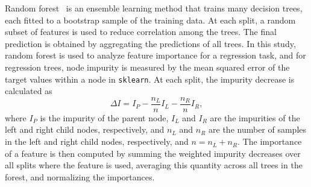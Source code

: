 Random forest~\cite{breiman2001random} is an ensemble learning method that trains many decision trees, each fitted to a bootstrap sample of the training data.
At each split, a random subset of features is used to reduce correlation among the trees.
The final prediction is obtained by aggregating the predictions of all trees.
In this study, random forest is used to analyze feature importance for a regression task, and for regression trees, node impurity is measured by the mean squared error of the target values within a node in \texttt{sklearn}.
At each split, the impurity decrease is calculated as
\begin{equation}
	\Delta I = I_P - \frac{n_L}{n}I_L - \frac{n_R}{n}I_R,
\end{equation}
where \(I_P\) is the impurity of the parent node, \(I_L\) and \(I_R\) are the impurities of the left and right child nodes, respectively, and \(n_L\) and \(n_R\) are the number of samples in the left and right child nodes, respectively, and \(n = n_L + n_R\).
The importance of a feature is then computed by summing the weighted impurity decreases over all splits where the feature is used, averaging this quantity across all trees in the forest, and normalizing the importances.

